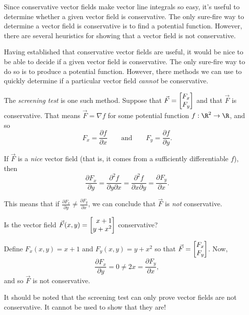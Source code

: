 Since conservative vector fields make vector line integrals so easy, it's useful
to determine whether a given vector field is conservative.  The only sure-fire
way to determine a vector field is conservative is to find a potential function.
However, there are several heuristics for showing that a vector field is not
conservative.

\bigskip

Having established that conservative vector fields are useful,
it would be nice to be able to decide if a given vector field is
conservative.  The only sure-fire way to do so is to produce a 
potential function.  However, there methods we can use to quickly
determine if a particular vector field \emph{cannot} be conservative.

The \emph{screening test} 
\label{SECSCREENING}
is one such method.  Suppose that $\vec F=\mat{F_x\\F_y}$
and that $\vec F$ is conservative.  That means $\vec F=\nabla f$
for some potential function $f:\R^2\to\R$, and so
\[
	F_x = \frac{\partial f}{\partial x}\qquad\text{and}\qquad 
	F_y=\frac{\partial f}{\partial y}.
\]

If $\vec F$ is a \emph{nice} vector field (that is, it comes from a sufficiently differentiable
$f$), then
\[
	\frac{\partial F_x}{\partial y} = 
	\frac{\partial^2 f}{\partial y\partial x} = 
	\frac{\partial^2 f}{\partial x\partial y} = 
	\frac{\partial F_y}{\partial x}. 
\]

This means that if $\frac{\partial F_x}{\partial y} \neq \frac{\partial F_y}{\partial x}$,
we can conclude that $\vec F$ is \emph{not} conservative.

\begin{example}
	Is the vector field $\vec F(x,y)=\mat{x+1\\y+x^2}$ conservative?

	Define $F_x(x,y)=x+1$ and $F_y(x,y)=y+x^2$ so that $\vec F  =\mat{F_x\\F_y}$.
	Now,
	\[
		\frac{\partial F_x}{\partial y} = 0
		\neq 2x = 
		\frac{\partial F_y}{\partial x},
	\]
	and so $\vec F$ is not conservative.
\end{example}

It should be noted that the screening test can only prove vector fields
are not conservative.  It cannot be used to show that they are!

